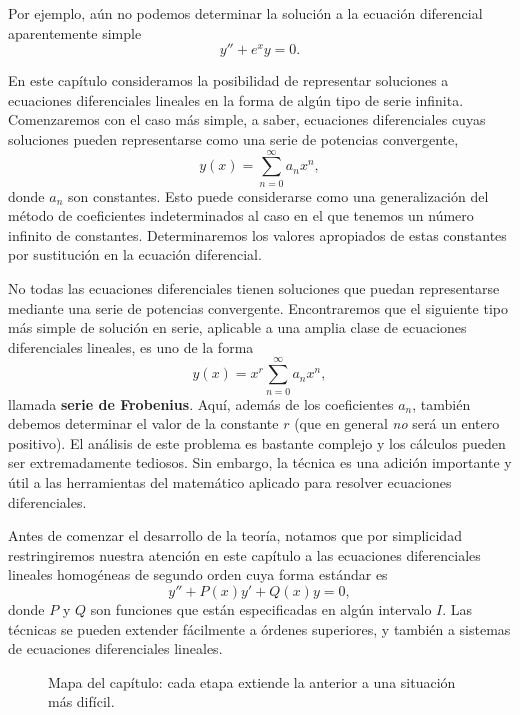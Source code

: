 Por ejemplo, aún no podemos determinar la solución a la ecuación diferencial aparentemente simple
\[ y'' + e^x y = 0. \]
 
En este capítulo consideramos la posibilidad de representar soluciones a ecuaciones diferenciales lineales en la forma de algún tipo de serie infinita. Comenzaremos con el caso más simple, a saber, ecuaciones diferenciales cuyas soluciones pueden representarse como una serie de potencias convergente,
\[ y(x) = \sum_{n=0}^{\infty} a_n x^n, \]
donde $a_n$ son constantes. Esto puede considerarse como una generalización del método de coeficientes indeterminados al caso en el que tenemos un número infinito de constantes. Determinaremos los valores apropiados de estas constantes por sustitución en la ecuación diferencial.
 
No todas las ecuaciones diferenciales tienen soluciones que puedan representarse mediante una serie de potencias convergente. Encontraremos que el siguiente tipo más simple de solución en serie, aplicable a una amplia clase de ecuaciones diferenciales lineales, es uno de la forma
\[ y(x) = x^r \sum_{n=0}^{\infty} a_n x^n, \]
llamada \textbf{serie de Frobenius}. Aquí, además de los coeficientes $a_n$, también debemos determinar el valor de la constante $r$ (que en general \textit{no} será un entero positivo). El análisis de este problema es bastante complejo y los cálculos pueden ser extremadamente tediosos. Sin embargo, la técnica es una adición importante y útil a las herramientas del matemático aplicado para resolver ecuaciones diferenciales.
 
Antes de comenzar el desarrollo de la teoría, notamos que por simplicidad restringiremos nuestra atención en este capítulo a las ecuaciones diferenciales lineales homogéneas de segundo orden cuya forma estándar es
\[ y'' + P(x)y' + Q(x)y = 0, \]
donde $P$ y $Q$ son funciones que están especificadas en algún intervalo $I$. Las técnicas se pueden extender fácilmente a órdenes superiores, y también a sistemas de ecuaciones diferenciales lineales.
 
\begin{figure}[H]
\centering
{}
\caption{Mapa del capítulo: cada etapa extiende la anterior a una situación más difícil.}
\label{fig:s1-mapa}
\end{figure}
 
